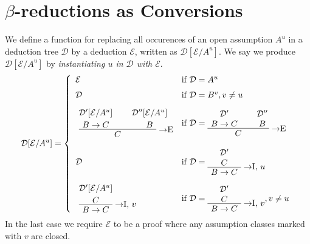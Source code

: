 \section{$\beta$-reductions as Conversions}

\begin{definition}
We define a function for replacing all occurences of an open assumption $A^u$ in
a deduction tree $\mathcal{D}$ by a deduction $\mathcal{E}$, written as
$\mathcal{D}[\mathcal{E}/A^u]$. We say we produce $\mathcal{D}[\mathcal{E}/A^u]$
by \textit{instantiating $u$ in $\mathcal{D}$ with $\mathcal{E}$}.
\[
  \mathcal{D}[\mathcal{E}/A^u] =
  \left\{
  \begin{array}{ll}
  \mathcal{E} & \mbox{if } \mathcal{D} = A^u \\[6pt]
  \mathcal{D} & \mbox{if } \mathcal{D} = B^v, v \neq u \\[10pt]
  \AxiomC{$\mathcal{D}'[\mathcal{E}/A^u]$}
  \noLine
  \UnaryInfC{$B \to C$}
  \AxiomC{$\mathcal{D}''[\mathcal{E}/A^u]$}
  \noLine
  \UnaryInfC{$B$}
  \RightLabel{$\to$E}
  \BinaryInfC{$C$}
  \DisplayProof & \mbox{if } \mathcal{D} =
    \AxiomC{$\mathcal{D}'$}
    \noLine
    \UnaryInfC{$B \to C$}
    \AxiomC{$\mathcal{D}''$}
    \noLine
    \UnaryInfC{$B$}
    \RightLabel{$\to$E}
    \BinaryInfC{$C$}
    \DisplayProof \\[24pt]
  \mathcal{D} & \mbox{if } \mathcal{D} =
    \AxiomC{$\mathcal{D}'$}
    \noLine
    \UnaryInfC{$C$}
    \RightLabel{$\to$I, $u$}
    \UnaryInfC{$B \to C$}
    \DisplayProof \\[20pt]
  \AxiomC{$\mathcal{D}'[\mathcal{E}/A^u]$}
  \noLine
  \UnaryInfC{$C$}
  \RightLabel{$\to$I, $v$}
  \UnaryInfC{$B \to C$}
  \DisplayProof & \mbox{if } \mathcal{D} =
    \AxiomC{$\mathcal{D}'$}
    \noLine
    \UnaryInfC{$C$}
    \RightLabel{$\to$I, $v$}
    \UnaryInfC{$B \to C$}
    \DisplayProof, v \neq u
  \end{array}
  \right.
\]
In the last case we require $\mathcal{E}$ to be a proof where any assumption
classes marked with $v$ are closed.
\end{definition}

